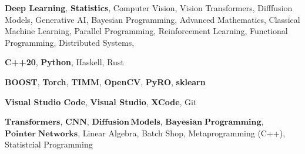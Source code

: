 %
%
%


	\begin{keywords}
		
			{
				\textbf{Deep Learning}, 
				\textbf{Statistics},
				Computer Vision,
				Vision Transformers,
				Difffusion Models,
				Generative AI,
				Bayesian Programming,
				Advanced Mathematics,
				Classical Machine Learning,
				Parallel Programming,
				Reinforcement Learning,
				Functional Programming,
				Distributed Systems,
			}
				
			{
				\textbf{C++20}, 
				\textbf{Python},
				 Haskell, 
				 Rust
			}
			
			{
				\textbf{BOOST},
				\textbf{Torch},
				\textbf{TIMM}, 
				\textbf{OpenCV},
				\textbf{PyRO},
				\textbf{sklearn}
			}
		
			{
				\textbf{Visual Studio Code},
				\textbf{Visual Studio}, 
				\textbf{XCode},
				Git
			}
		
		{
			$\mathbf{Transformers}$, $\mathbf{CNN}$,  $\mathbf{Diffusion \hspace{2pt} Models}$, $\mathbf{Bayesian\;Programming}$, 
			$\mathbf{Pointer \;Networks}$, Linear Algebra, Batch Shop, Metaprogramming (C++), Statistcial Programming
		}		
				

	\end{keywords}
